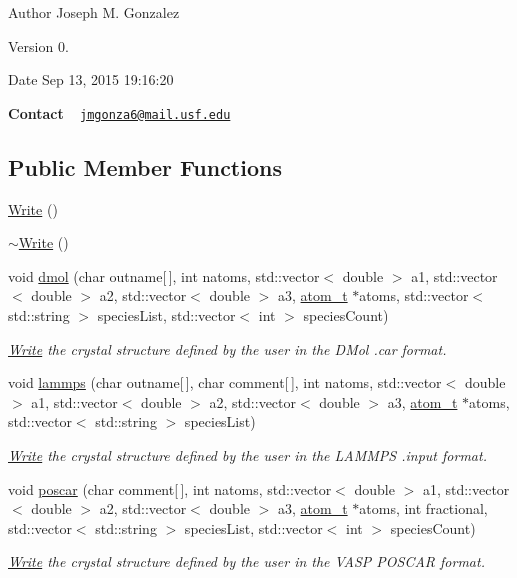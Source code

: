 \begin{DoxyAuthor}{Author}
Joseph M. Gonzalez
\end{DoxyAuthor}
\begin{DoxyVersion}{Version}
0.
\end{DoxyVersion}
\begin{DoxyDate}{Date}
Sep 13, 2015 19\+:16\+:20
\end{DoxyDate}
{\bfseries Contact} ~\newline
 \href{mailto:jmgonza6@mail.usf.edu}{\tt jmgonza6@mail.\+usf.\+edu} \subsection*{Public Member Functions}
\begin{DoxyCompactItemize}
\item 
\hyperlink{class_write_ad38d186b30ba3068550a3eec7879c433}{Write} ()
\item 
\hyperlink{class_write_a229158e0f40b815df57224e32c1fa377}{$\sim$\+Write} ()
\item 
void \hyperlink{class_write_a01d6843fd3be8283ce78978b77fcf4f8}{dmol} (char outname\mbox{[}$\,$\mbox{]}, int natoms, std\+::vector$<$ double $>$ a1, std\+::vector$<$ double $>$ a2, std\+::vector$<$ double $>$ a3, \hyperlink{structatom__t}{atom\+\_\+t} $\ast$atoms, std\+::vector$<$ std\+::string $>$ species\+List, std\+::vector$<$ int $>$ species\+Count)
\begin{DoxyCompactList}\small\item\em \hyperlink{class_write}{Write} the crystal structure defined by the user in the D\+Mol {\ttfamily .car} format. \end{DoxyCompactList}\item 
void \hyperlink{class_write_a410edc16f935d4f9d472c1193a023d1f}{lammps} (char outname\mbox{[}$\,$\mbox{]}, char comment\mbox{[}$\,$\mbox{]}, int natoms, std\+::vector$<$ double $>$ a1, std\+::vector$<$ double $>$ a2, std\+::vector$<$ double $>$ a3, \hyperlink{structatom__t}{atom\+\_\+t} $\ast$atoms, std\+::vector$<$ std\+::string $>$ species\+List)
\begin{DoxyCompactList}\small\item\em \hyperlink{class_write}{Write} the crystal structure defined by the user in the L\+A\+M\+M\+P\+S {\ttfamily .input} format. \end{DoxyCompactList}\item 
void \hyperlink{class_write_a22efe8e3dbca6d3e85488a6c7952903c}{poscar} (char comment\mbox{[}$\,$\mbox{]}, int natoms, std\+::vector$<$ double $>$ a1, std\+::vector$<$ double $>$ a2, std\+::vector$<$ double $>$ a3, \hyperlink{structatom__t}{atom\+\_\+t} $\ast$atoms, int fractional, std\+::vector$<$ std\+::string $>$ species\+List, std\+::vector$<$ int $>$ species\+Count)
\begin{DoxyCompactList}\small\item\em \hyperlink{class_write}{Write} the crystal structure defined by the user in the V\+A\+S\+P {\ttfamily P\+O\+S\+C\+A\+R} format. \end{DoxyCompactList}\end{DoxyCompactItemize}
